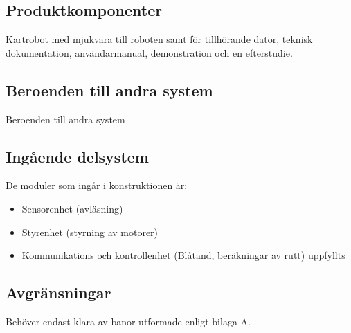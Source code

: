 \documentclass[a4paper,11pt]{article}
\begin{document}
\subsection{Produktkomponenter}
Kartrobot med mjukvara till roboten samt för tillhörande dator, teknisk dokumentation, användarmanual, demonstration och en efterstudie. 

\subsection{Beroenden till andra system }
Beroenden till andra system 

\subsection{Ingående delsystem}
De moduler som ingår i konstruktionen är:
\begin{itemize}
    \item Sensorenhet (avläsning) 
    \item Styrenhet (styrning av motorer) 
    \item Kommunikations och kontrollenhet (Blåtand, beräkningar av rutt)  uppfyllts 
\end{itemize}

\subsection{Avgränsningar}
Behöver endast klara av banor utformade enligt bilaga A. 
\end{document}
